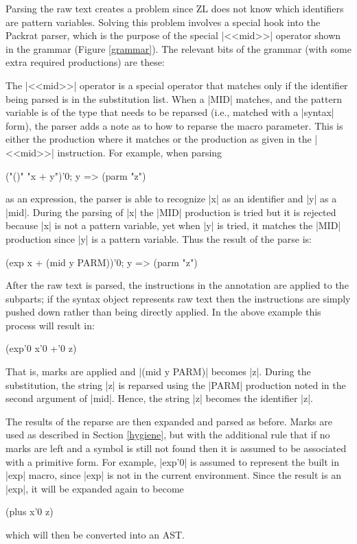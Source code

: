Parsing the raw text creates a problem since ZL does not know which
identifiers are pattern variables.  Solving this problem involves a
special hook into the Packrat parser, which is the purpose of the
special |<<mid>>| operator shown in the grammar (Figure
\ref{grammar}).  The relevant bits of the grammar (with some extra
required productions) are these:
The |<<mid>>| operator is a special operator that matches only if the
identifier being parsed is in the substitution list.  When a |MID| matches, and the
pattern variable is of the type that needs to be reparsed (i.e., matched
with a |syntax| form), the parser adds a note as to how to reparse the
macro parameter.  This is either the production where it matches or
the production as given in the |<<mid>>| instruction.  For
example, when parsing
\begin{code}
("()" "x + y"){'0; y => (parm "z")}
\end{code}
as an expression, the parser is
able to recognize |x| as an identifier and |y| as a
|mid|.  During the parsing of |x| the |MID| production
is tried but it is rejected because |x| is not a pattern
variable, yet when |y| is tried, it matches the |MID| production
since |y| is a pattern variable.  Thus the result of the parse is:
\begin{code}
(exp x + (mid y PARM)){'0; y => (parm "z")}
\end{code}

After the raw text is parsed, the instructions in the annotation are
applied to the subparts; if the syntax object represents raw text
then the instructions are simply pushed down rather than being
directly applied.  In the above example this process will result in:
\begin{code}
(exp'0 x'0 +'0 z)
\end{code}
That is, marks are applied and |(mid y PARM)| becomes |z|.  During the
substitution, the string |z| is reparsed using the |PARM| production
noted in the second argument of |mid|.  Hence, the string |z| becomes
the identifier |z|.

The results of the reparse are then expanded and parsed as before.
Marks are used as described in Section \ref{hygiene}, but with the
additional rule that if no marks are left and a symbol is still not
found then it is assumed to be associated with a primitive form.  For
example, |exp'0| is assumed to represent the built in |exp| macro,
since |exp| is not in the current environment.  Since the result is an
|exp|, it will be expanded again to become
\begin{code}
(plus x'0 z)
\end{code}
which will then be converted into an AST.


